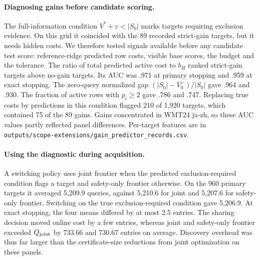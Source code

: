 \paragraph{Diagnosing gains before candidate scoring.}
The full-information condition $V^*+\varepsilon<|S_0|$ marks targets requiring exclusion evidence. On this grid it coincided with the 89 recorded strict-gain targets, but it needs hidden costs. We therefore tested signals available before any candidate test score: reference-ridge predicted row costs, visible base scores, the budget and the tolerance. The ratio of total predicted active cost to $b_H$ ranked strict-gain targets above no-gain targets. Its AUC was .971 at primary stopping and .959 at exact stopping. The zero-query normalized gap $(|S_0|-V^-_0)/|S_0|$ gave .964 and .930. The fraction of active rows with $p_i\ge2$ gave .786 and .747. Replacing true costs by predictions in this condition flagged 210 of 1,920 targets, which contained 75 of the 89 gains. Gains concentrated in WMT24 ja-zh, so these AUC values partly reflected panel differences. Per-target features are in \nolinkurl{outputs/scope-extensions/gain_predictor_records.csv}.

\paragraph{Using the diagnostic during acquisition.}
A switching policy uses joint frontier when the predicted exclusion-required condition flags a target and safety-only frontier otherwise. On the 960 primary targets it averaged 5,209.9 queries, against 5,210.6 for joint and 5,207.6 for safety-only frontier. Switching on the true exclusion-required condition gave 5,206.9. At exact stopping, the four means differed by at most 2.5 entries. The sharing decision moved online cost by a few entries, whereas joint and safety-only frontier exceeded $Q_{\rm joint}$ by 733.66 and 730.67 entries on average. Discovery overhead was thus far larger than the certificate-size reductions from joint optimization on these panels.


